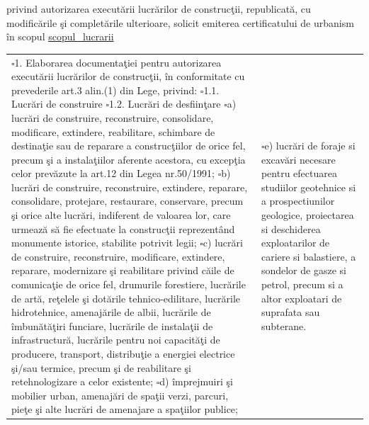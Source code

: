\documentclass[10pt,a4paper]{article}
\newcommand{\checkboxempty}{$\square$}
\begin{document}
privind autorizarea executării lucrărilor de construcţii, republicată, cu modificările şi completările ulterioare, solicit emiterea certificatului de urbanism în scopul \underline{ {{scopul_lucrarii}} }

\hrulefill

\hrulefill

\vspace{0.25cm}

\begin{tabularx}{\textwidth}{|X|X|}
\hline
\checkboxempty 1. Elaborarea documentaţiei pentru autorizarea executării lucrărilor de construcţii, în conformitate cu prevederile art.3 alin.(1) din Lege, privind:\newline
\checkboxempty 1.1. Lucrări de construire\newline
\checkboxempty 1.2. Lucrări de desfiinţare\newline
\checkboxempty a) lucrări de construire, reconstruire, consolidare, modificare, extindere, reabilitare, schimbare de destinaţie sau de reparare a construcţiilor de orice fel, precum şi a instalaţiilor aferente acestora, cu excepţia celor prevăzute la art.12 din Legea nr.50/1991;\newline
\checkboxempty b) lucrări de construire, reconstruire, extindere, reparare, consolidare, protejare, restaurare, conservare, precum şi orice alte lucrări, indiferent de valoarea lor, care urmează să fie efectuate la construcţii reprezentând monumente istorice, stabilite potrivit legii;\newline
\checkboxempty c) lucrări de construire, reconstruire, modificare, extindere, reparare, modernizare şi reabilitare privind căile de comunicaţie de orice fel, drumurile forestiere, lucrările de artă, reţelele şi dotările tehnico-edilitare, lucrările hidrotehnice, amenajările de albii, lucrările de îmbunătăţiri funciare, lucrările de instalaţii de infrastructură, lucrările pentru noi capacităţi de producere, transport, distribuţie a energiei electrice şi/sau termice, precum şi de reabilitare şi retehnologizare a celor existente;\newline
\checkboxempty d) împrejmuiri şi mobilier urban, amenajări de spaţii verzi, parcuri, pieţe şi alte lucrări de amenajare a spaţiilor publice;
&
\checkboxempty e) lucrări de foraje si excavări necesare pentru efectuarea studiilor geotehnice si a prospectiunilor geologice, proiectarea si deschiderea exploatarilor de cariere si balastiere, a sondelor de gasze si petrol, precum si a altor exploatari de suprafata sau subterane.\newline

\end{tabularx}
\end{document}
